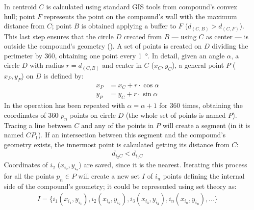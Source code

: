             In  centroid $C$ is calculated using standard GIS tools from compound's convex hull; point $F$ represents the point on the compound's wall with the maximum distance from $C$; point $B$ is obtained applying a buffer to $F$ ($d_{(C,B)} > d_{(C,F)}$). This last step ensures that the circle $D$ created from $B$ --- using $C$ as center --- is outside the compound's geometry (). A set of points is created on $D$ dividing the perimeter by 360, obtaining one point every \SI{1}{\degree}. In detail, given an angle $\alpha$, a circle $D$ with radius $r=d_{(C,B)}$ and center in $C$ ($x_C, y_C$), a general point $P$ ($x_P, y_P$) on $D$ is defined by:
            \begin{align}
                \label{eq:point-circle}
                x_P &= x_C + r\cdot\cos\alpha\\
                y_P &= y_C + r\cdot\sin\alpha
            \end{align}
            In  the operation has been repeated with $\alpha=\alpha+1$ for 360 times, obtaining the coordinates of 360 $p_n$ points on circle $D$ (the whole set of points is named $P$). Tracing a line between $C$ and any of the points in $P$ will create a segment (in  it is named $CP_1$). If an intersection between this segment and the compound's geometry exists, the innermost point is calculated getting its distance from $C$:
            \begin{align}
                \label{eq:innerpoint}
                d_{i_2 C} < d_{i_1 C}
            \end{align}
            Coordinates of $i_2$ ($x_{i_2}, y_{i_2}$) are saved, since it is the nearest. Iterating this process for all the points $p_n\in P$ will create a new set $I$ of $i_n$ points defining the internal side of the compound's geometry; it could be represented using set theory \cite{molenaar2003} as:
            \begin{align}
                \label{inter-set}
                I = \{ i_1 (x_{i_1}, y_{i_1}), i_2 (x_{i_2}, y_{i_2}), i_3 (x_{i_3}, y_{i_3}), i_n (x_{i_n}, y_{i_n}), \ldots \}
            \end{align}
